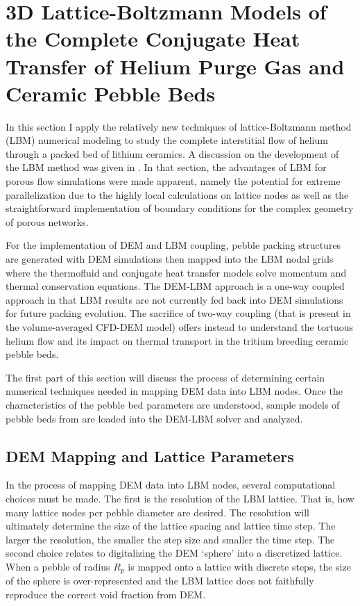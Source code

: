 
\chapter{3D Lattice-Boltzmann Models of the Complete Conjugate Heat Transfer of Helium Purge Gas and Ceramic Pebble Beds}\label{sec:lbm-studies}

In this section I apply the relatively new techniques of lattice-Boltzmann method (LBM) numerical modeling to study the complete interstitial flow of helium through a packed bed of lithium ceramics. A discussion on the development of the LBM method was given in . In that section, the advantages of LBM for porous flow simulations were made apparent, namely the potential for extreme parallelization due to the highly local calculations on lattice nodes as well as the straightforward implementation of boundary conditions for the complex geometry of porous networks.

For the implementation of DEM and LBM coupling, pebble packing structures are generated with DEM simulations then mapped into the LBM nodal grids where the thermofluid and conjugate heat transfer models solve momentum and thermal conservation equations. The DEM-LBM approach is a one-way coupled approach in that LBM results are not currently fed back into DEM simulations for future packing evolution. The sacrifice of two-way coupling (that is present in the volume-averaged CFD-DEM model) offers instead to understand the tortuous helium flow and its impact on thermal transport in the tritium breeding ceramic pebble beds.

The first part of this section will discuss the process of determining certain numerical techniques needed in mapping DEM data into LBM nodes. Once the characteristics of the pebble bed parameters are understood, sample models of pebble beds from  are loaded into the DEM-LBM solver and analyzed.


\section{DEM Mapping and Lattice Parameters}
In the process of mapping DEM data into LBM nodes, several computational choices must be made. The first is the resolution of the LBM lattice. That is, how many lattice nodes per pebble diameter are desired. The resolution will ultimately determine the size of the lattice spacing and lattice time step. The larger the resolution, the smaller the step size and smaller the time step. The second choice relates to digitalizing the DEM `sphere' into a discretized lattice. When a pebble of radius $R_p$ is mapped onto a lattice with discrete steps, the size of the sphere is over-represented and the LBM lattice does not faithfully reproduce the correct void fraction from DEM.

